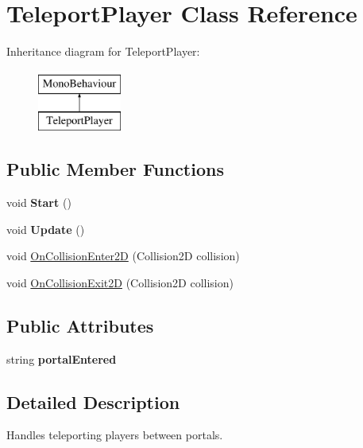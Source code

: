 \hypertarget{class_teleport_player}{}\section{Teleport\+Player Class Reference}
\label{class_teleport_player}
Inheritance diagram for Teleport\+Player\+:\begin{figure}[H]
\begin{center}
\leavevmode
\includegraphics[height=2.000000cm]{class_teleport_player}
\end{center}
\end{figure}
\subsection*{Public Member Functions}
\begin{DoxyCompactItemize}
\item 
\mbox{\label{class_teleport_player_ad75d1699964434878bf8a31244a6a4af}} 
void {\bfseries Start} ()
\item 
\mbox{\label{class_teleport_player_ab8dc957d5f4ca8e3bee2d4b48ac0ed23}} 
void {\bfseries Update} ()
\item 
void \mbox{\hyperlink{class_teleport_player_a1ab94b6c3d13f1287f9127393afe2298}{On\+Collision\+Enter2D}} (Collision2D collision)
\item 
void \mbox{\hyperlink{class_teleport_player_ac85fc2322d2dc27de518434422c2c25e}{On\+Collision\+Exit2D}} (Collision2D collision)
\end{DoxyCompactItemize}
\subsection*{Public Attributes}
\begin{DoxyCompactItemize}
\item 
\mbox{\label{class_teleport_player_acf473b96518845695a6ec35fa0db2510}} 
string {\bfseries portal\+Entered}
\end{DoxyCompactItemize}


\subsection{Detailed Description}
Handles teleporting players between portals. 

